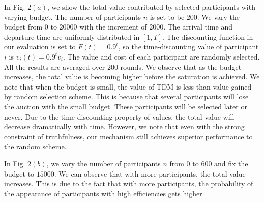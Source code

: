 \documentclass[10pt,journal,letterpaper,compsoc]{IEEEtran}
\begin{document}
In Fig. $2(a)$, we show the total value contributed by selected participants with varying budget. The number of participants $n$ is set to be $200$. We vary the budget from $0$ to $20000$ with the increment of $2000$. The arrival time and departure time are uniformly distributed in $[1,T]$. The discounting function in our evaluation is set to $F(t) = 0.9^t$, so the time-discounting value of participant $i$ is $v_i(t) = 0.9^tv_i$. The value and cost of each participant are randomly selected. All the results are averaged over 200 rounds. We observe that as the budget increases, the total value is becoming higher before the saturation is achieved. We note that when the budget is small, the value of TDM is less than value gained by random selection scheme. This is because that several participants will lose the auction with the small budget. These participants will be selected later or never. Due to the time-discounting property of values, the total value will decrease dramatically with time. However, we note that even with the strong constraint of truthfulness, our mechanism still achieves superior performance to the random scheme.

In Fig. $2(b)$, we vary the number of participants $n$ from $0$ to $600$ and fix the budget to $15000$. We can observe that with more participants, the total value increases. This is due to the fact that with more participants, the probability of the appearance of participants with high efficiencies gets higher.
\end{document}
